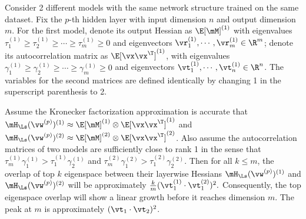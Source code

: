 \begin{theorem}
Consider 2 different models with the same network structure trained on the same dataset. Fix the $p$-th hidden layer with input dimension $n$ and output dimension $m$. For the first model, denote its output Hessian as $\E[\mM]^{(1)}$ with eigenvalues $\tau^{(1)}_1 \geq \tau^{(1)}_2 \geq \cdots \geq \tau^{(1)}_m \geq 0$ and eigenvectors $\vr^{(1)}_1, \cdots, \vr^{(1)}_m\in\R^m$; denote its autocorrelation matrix as $\E[\vx\vx^\T]^{(1)}$, with eigenvalues $\gamma^{(1)}_1 \geq \gamma^{(1)}_2 \geq \cdots \geq \gamma^{(1)}_m \geq 0$ and eigenvectors $\vt^{(1)}_1, \cdots, \vt^{(1)}_n\in\R^n$. The variables for the second matrices are defined identically by changing 1 in the superscript parenthesis to 2.

Assume the Kronecker factorization approximation is accurate that $\mH_\Ls(\vw^{(p)})^{(1)}\approx \E[\mM]^{(1)}\otimes \E[\vx\vx^\T]^{(1)}$ and $\mH_\Ls(\vw^{(p)})^{(2)}\approx \E[\mM]^{(2)}\otimes \E[\vx\vx^\T]^{(2)}$.
Also assume the autocorrelation matrices of two models are sufficiently close to rank 1 in the sense that $\tau^{(1)}_m\gamma^{(1)}_1 > \tau^{(1)}_1\gamma^{(1)}_2$ and $\tau^{(2)}_m\gamma^{(2)}_1 > \tau^{(2)}_1\gamma^{(2)}_2$.
Then for all $k\leq m$, the overlap of top $k$ eigenspace between their layerwise Hessians $\mH_\Ls(\vw^{(p)})^{(1)}$ and $\mH_\Ls(\vw^{(p)})^{(2)}$ will be approximately 
$\frac{k}{m}(\vt^{(1)}_1 \cdot \vt^{(2)}_1)^2.$
Consequently, the top eigenspace overlap will show a linear growth before it reaches dimension $m$. The peak at $m$ is approximately $(\vt_1 \cdot \vt_2)^2$.
\label{thm:model_overlap}
\end{theorem}


